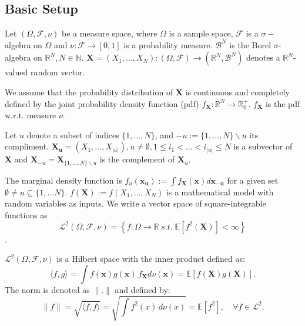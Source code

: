 \subsection*{Basic Setup}
Let $(\Omega, \mathcal{F}, \nu)$ be a measure space, where $\Omega$ is a sample space, $\mathcal{F}$ is a $\sigma-$algebra on $\Omega$ and $\nu: \mathcal{F} \rightarrow [0, 1]$ is a probability measure. $\mathcal{B}^N$ is the Borel $\sigma$-algebra on $\mathbb{R}^N, N \in \mathbb{N}$.
$\boldsymbol{X} = (X_1, \dots, X_N): (\Omega, \mathcal{F}) \rightarrow (\mathbb{R}^N, \mathcal{B}^N)$ denotes a $\mathbb{R}^N$-valued random vector.\par
We assume that the probability distribution of $\boldsymbol{X}$ is continuous and completely defined by the joint probability density function (pdf) $f_{\boldsymbol{X}}: \mathbb{R}^N \rightarrow \mathbb{R}_{0}^+$. $f_{\boldsymbol{X}}$ is the pdf w.r.t. measure $\nu$. \par

Let $u$ denote a subset of indices $\{1, \dots, N\}$, and $-u := \{1, \dots, N\} \backslash{} u$ its compliment.
$\boldsymbol{X_u} = (X_1, \dots, X_{|u|}), u \neq \emptyset, 1 \leq i_1 < \dots < i_{|u|} \leq N$ is a subvector of $\boldsymbol{X}$ and $\boldsymbol{X}_{-u} = \boldsymbol{X}_{\{1, \dots, N\} \backslash{} u}$ is the complement of $\boldsymbol{X}_u$.\par

The marginal density function is $f_u(\boldsymbol{x_u}) := \int f_{\boldsymbol{X}}(\boldsymbol{x})d\boldsymbol{x_{-u}}$ for a given set $\emptyset \neq u \subseteq \{1, \dots N\}$.
$f(\boldsymbol{X}) := f(X_1, \dots, X_N)$ is a mathematical model with random variables as inputs.
We write a vector space of square-integrable functions as
\[\mathcal{L}^2(\Omega, \mathcal{F}, \nu) = \left\{ f: \Omega \rightarrow \mathbb{R} \; \textit{s.t.} \; \mathbb{E}[f^2(\boldsymbol{X})] < \infty \right\}\].

$\mathcal{L}^2(\Omega, \mathcal{F}, \nu)$ is a Hilbert space with the inner product defined as:
\[
\langle f, g \rangle = \int f(\boldsymbol{x}) g(\boldsymbol{x}) \, f_{\boldsymbol{X}}d\nu(\boldsymbol{x}) = \mathbb{E}[f(\boldsymbol{X})g(\boldsymbol{X})].
\]
The norm is denoted as $\|.\| $ and defined by:
\[
\|f\| = \sqrt{\langle f, f \rangle} = \sqrt{\int f^2(x) \, d\nu(x)} = \mathbb{E}[f^2], \quad \forall f \in \mathcal{L}^2.
\]

